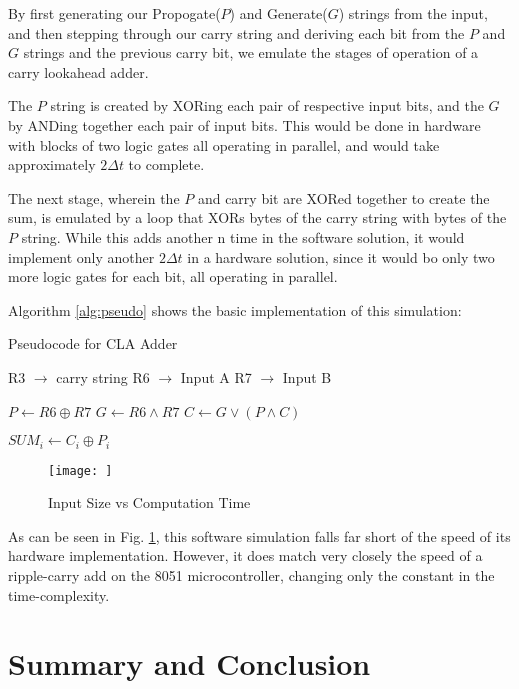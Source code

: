 \documentclass[journal]{IEEEtran}
\begin{document}
By first generating our Propogate($P$) and Generate($G$) strings from the input,
and then stepping through our carry string and deriving each bit from the
$P$ and $G$ strings and the previous carry bit, we emulate the stages of
operation of a carry lookahead adder.

The $P$ string is created by XORing each pair of respective input bits, and the
$G$ by ANDing together each pair of input bits. This would be done in hardware
with blocks of two logic gates all operating in parallel, and would take
approximately $2\Delta t$ to complete.

The next stage, wherein the $P$ and carry bit are XORed together to create the
sum, is emulated by a loop that XORs bytes of the carry string with bytes of
the $P$ string. While this adds another n time in the software solution, it
would implement only another $2\Delta t$ in a hardware solution, since it would
bo only two more logic gates for each bit, all operating in parallel.

Algorithm \ref{alg:pseudo}
shows the basic implementation of this simulation:
\begin{algorithm}[H]
\caption{Pseudocode for CLA Adder}
\label{alg:pseudo}
\begin{algorithmic}
\State R3 $\rightarrow$ carry string
\State R6 $\rightarrow$ Input A
\State R7 $\rightarrow$ Input B

	\State $P \gets R6 \oplus R7$
	\State $G \gets R6 \land R7$
\EndFor
{}
	\State $C \gets G \lor (P \land C)$
\EndFor

	\State $SUM_i \gets C_i \oplus P_i$
\EndFor
\end{algorithmic}
\end{algorithm}

\begin{figure}
	\texttt{[image: ]}
	\caption{Input Size vs Computation Time}
	\label{fig:time}
\end{figure}

As can be seen in Fig. \ref{fig:time}, this software simulation falls far
short of the speed of its hardware implementation. However, it does match very
closely the speed of a ripple-carry add on the 8051 microcontroller, changing
only the constant in the time-complexity.

\section{Summary and Conclusion}
\end{document}
